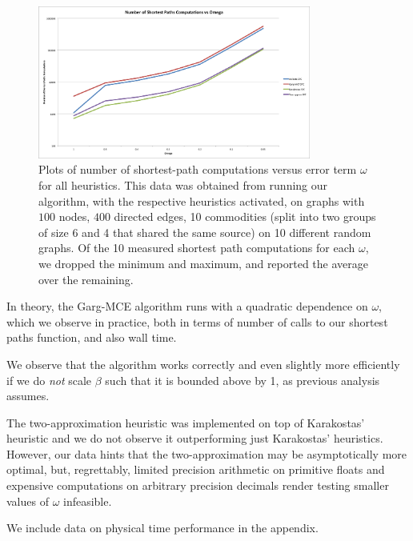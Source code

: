 \begin{figure}\begin{center}\mbox{\includegraphics[width=0.8\textwidth]{figures/omegas.png}}
\caption{Plots of number of shortest-path computations versus error term
$\omega$ for all heuristics. This data was obtained from running our
algorithm, with the respective heuristics activated, on graphs with $100$
nodes, $400$ directed edges, 10 commodities (split into two groups of size 6
and 4 that shared the same source) on 10 different random graphs. Of the 10
measured shortest path computations for each $\omega$, we dropped the minimum
and maximum, and reported the average over the remaining.} \end{center}
\end{figure}
In theory, the Garg-MCE algorithm runs
with a quadratic dependence on $\omega$, which we observe in practice, both in
terms of number of calls to our shortest paths function, and also wall time.


We observe that the algorithm works correctly and even slightly more
efficiently if we do \emph{not} scale $\beta$ such that it is bounded above by
1, as previous analysis assumes.

The two-approximation heuristic was implemented on top of Karakostas' heuristic
and we do not observe it outperforming just Karakostas' heuristics. However,
our data hints that the two-approximation may be asymptotically more optimal,
but, regrettably, limited precision arithmetic on primitive floats and
expensive computations on arbitrary precision decimals render testing smaller
values of $\omega$ infeasible.

We include data on physical time performance in the appendix.

